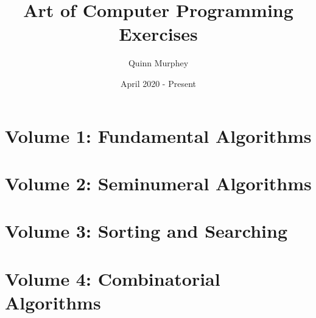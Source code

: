 \documentclass[12pt,letterpaper]{book}
\title{Art of Computer Programming Exercises}
\author{Quinn Murphey}
\date{April 2020 - Present}
\begin{document}
\maketitle

\newpage
\part*{Volume 1: Fundamental Algorithms}


\newpage
\part*{Volume 2: Seminumeral Algorithms}


\newpage
\part*{Volume 3: Sorting and Searching}


\newpage
\part*{Volume 4: Combinatorial Algorithms}


%

%

%
\end{document}
